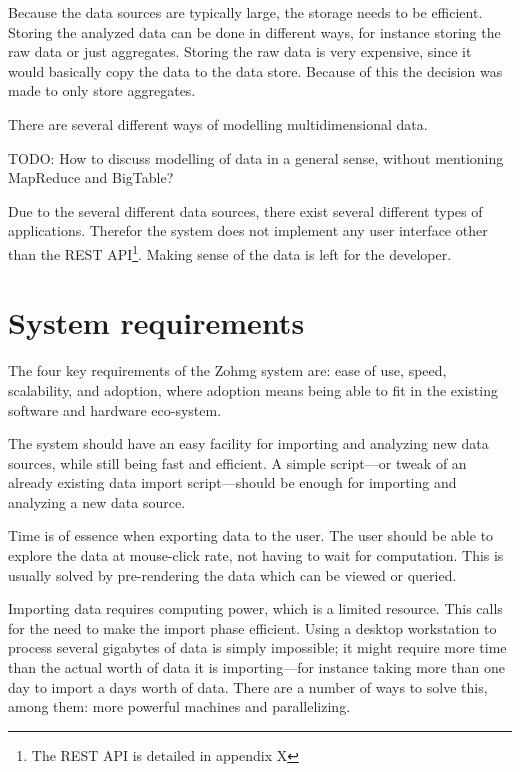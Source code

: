 Because the data sources are typically large, the storage needs to be efficient.
Storing the analyzed data can be done in different ways, for instance storing
the raw data or just aggregates. Storing the raw data is very expensive, since
it would basically copy the data to the data store. Because of this the decision
was made to only store aggregates.

There are several different ways of modelling multidimensional data.

TODO: How to discuss modelling of data in a general sense, without mentioning
MapReduce and BigTable?

Due to the several different data sources, there exist several
different types of applications. Therefor the system does not implement any user
interface other than the REST API\footnote{The REST API is detailed in appendix
X}. Making sense of the data is left for the developer.


\section{System requirements}


The four key requirements of the Zohmg system are: ease of use, speed,
scalability, and adoption, where adoption means being able to fit in the
existing software and hardware eco-system.

The system should have an easy facility for importing and analyzing new data
sources, while still being fast and efficient. A simple script---or tweak of an
already existing data import script---should be enough for importing and
analyzing a new data source.

Time is of essence when exporting data to the user. The user should be able to
explore the data at mouse-click rate, not having to wait for computation. This
is usually solved by pre-rendering the data which can be viewed or queried.

Importing data requires computing power, which is a limited resource. This calls
for the need to make the import phase efficient. Using a desktop workstation to
process several gigabytes of data is simply impossible; it might require more
time than the actual worth of data it is importing---for instance taking more
than one day to import a days worth of data. There are a number of ways to solve
this, among them: more powerful machines and parallelizing.

